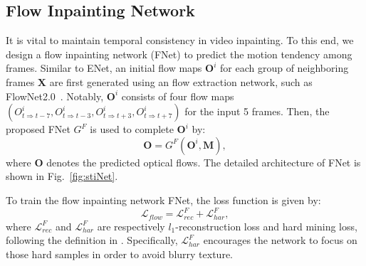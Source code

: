 \subsection{Flow Inpainting Network}

It is vital to maintain temporal consistency in video inpainting.
To this end, we design a flow inpainting network (FNet) to predict the motion tendency among frames.
%
Similar to ENet, an initial flow maps \(\boldsymbol{O}^i\) for each group of neighboring frames $\boldsymbol{X}$ are first generated using an flow extraction network, such as FlowNet2.0~\cite{Flownet_2017_CVPR}.
Notably, \(\boldsymbol{O}^i\) consists of four flow maps \((O^i_{t\Rightarrow t-7}, O^i_{t\Rightarrow t-3}, O^i_{t\Rightarrow t+3}, O^i_{t\Rightarrow t+7})\) for the input 5 frames.
Then, the proposed FNet $G^F$ is used to complete \(\boldsymbol{O}^i\) by:
\begin{equation}
\label{eq:flownet}
\boldsymbol{O}=G^F(\boldsymbol{O}^{i},\boldsymbol{M}),
\end{equation}
where $\boldsymbol{O}$ denotes the predicted optical flows.
%
The detailed architecture of FNet is shown in Fig.~\ref{fig:stiNet}.

To train the flow inpainting network FNet, the loss function is given by:
\begin{equation}
\label{eq:flow_all}
\mathcal{L}_{flow}=\mathcal{L}^F_{rec}+ \mathcal{L}^F_{har},
\end{equation}
where $\mathcal{L}^F_{rec}$ and $\mathcal{L}^F_{har}$ are respectively $l_1$-reconstruction loss and hard mining loss, following the definition in \cite{Xu_2019_CVPR}. 
Specifically, $\mathcal{L}^F_{har}$ encourages the network to focus on those hard samples in order to avoid blurry texture.

%

